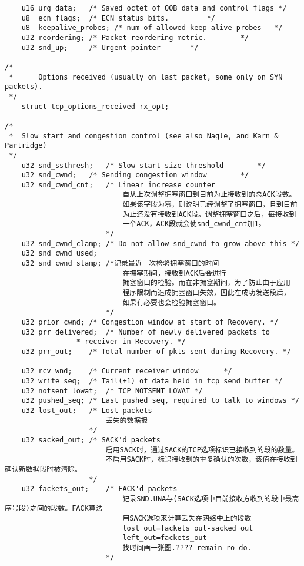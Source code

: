 \begin{verbatim}
    u16 urg_data;   /* Saved octet of OOB data and control flags */
    u8  ecn_flags;  /* ECN status bits.         */
    u8  keepalive_probes; /* num of allowed keep alive probes   */
    u32 reordering; /* Packet reordering metric.        */
    u32 snd_up;     /* Urgent pointer       */

/*
 *      Options received (usually on last packet, some only on SYN packets).
 */
    struct tcp_options_received rx_opt;

/*
 *  Slow start and congestion control (see also Nagle, and Karn & Partridge)
 */
    u32 snd_ssthresh;   /* Slow start size threshold        */
    u32 snd_cwnd;   /* Sending congestion window        */
    u32 snd_cwnd_cnt;   /* Linear increase counter      
                            自从上次调整拥塞窗口到目前为止接收到的总ACK段数。
                            如果该字段为零，则说明已经调整了拥塞窗口，且到目前
                            为止还没有接收到ACK段。调整拥塞窗口之后，每接收到
                            一个ACK，ACK段就会使snd_cwnd_cnt加1。
                        */
    u32 snd_cwnd_clamp; /* Do not allow snd_cwnd to grow above this */
    u32 snd_cwnd_used;
    u32 snd_cwnd_stamp; /*记录最近一次检验拥塞窗口的时间
                            在拥塞期间，接收到ACK后会进行
                            拥塞窗口的检验。而在非拥塞期间，为了防止由于应用
                            程序限制而造成拥塞窗口失效，因此在成功发送段后，
                            如果有必要也会检验拥塞窗口。
                        */
    u32 prior_cwnd; /* Congestion window at start of Recovery. */
    u32 prr_delivered;  /* Number of newly delivered packets to
                 * receiver in Recovery. */
    u32 prr_out;    /* Total number of pkts sent during Recovery. */

    u32 rcv_wnd;    /* Current receiver window      */
    u32 write_seq;  /* Tail(+1) of data held in tcp send buffer */
    u32 notsent_lowat;  /* TCP_NOTSENT_LOWAT */
    u32 pushed_seq; /* Last pushed seq, required to talk to windows */
    u32 lost_out;   /* Lost packets         
                        丢失的数据报
                    */
    u32 sacked_out; /* SACK'd packets           
                        启用SACK时，通过SACK的TCP选项标识已接收到的段的数量。
                        不启用SACK时，标识接收到的重复确认的次数，该值在接收到确认新数据段时被清除。
                    */
    u32 fackets_out;    /* FACK'd packets           
                            记录SND.UNA与(SACK选项中目前接收方收到的段中最高序号段)之间的段数。FACK算法
                            用SACK选项来计算丢失在网络中上的段数
                            lost_out=fackets_out-sacked_out
                            left_out=fackets_out
                            找时间画一张图.???? remain ro do.
                        */


\end{verbatim}
